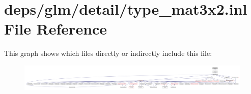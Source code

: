 \hypertarget{type__mat3x2_8inl}{}\section{deps/glm/detail/type\+\_\+mat3x2.inl File Reference}
\label{type__mat3x2_8inl}
This graph shows which files directly or indirectly include this file\+:
\nopagebreak
\begin{figure}[H]
\begin{center}
\leavevmode
\includegraphics[width=350pt]{d2/ded/type__mat3x2_8inl__dep__incl}
\end{center}
\end{figure}
